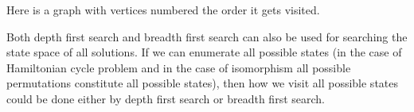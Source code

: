 Here is a graph with vertices numbered the order it gets visited.

Both depth first search and breadth first search can also be used for searching the state space of all solutions. If we can enumerate all possible states (in the case of Hamiltonian cycle problem and in the case of isomorphism all possible permutations constitute all possible states), then how we visit all possible states could be done either by depth first search or breadth first search.